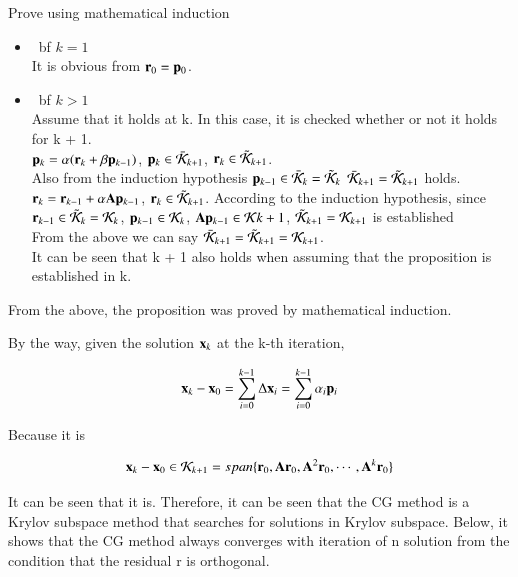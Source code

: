 Prove using mathematical induction

\begin {itemize}
\item {\ bf $k=1$} \\
It is obvious from $\mathbf{r}_0=\mathbf{p}_0$.

\item {\ bf $k>1$} \\
Assume that it holds at k. In this case, it is checked whether or not it holds for k + 1. \\
$\mathbf{p}_k=\alpha(\mathbf{r}_k+\beta\mathbf{p}_{k-1})$, $\mathbf{p}_k\in\bar{\cal K}_{k+1}$, $\mathbf{r}_k\in\tilde{\cal K}_{k+1}$. \\
Also from the induction hypothesis $\mathbf{p}_{k-1}\in\bar{\cal K}_k=\tilde{\cal K}_k$ $\bar{\cal K}_{k+1}=\tilde{\cal K}_{k+1}$ holds. \\
$\mathbf{r}_k=\mathbf{r}_{k-1}+\alpha\mathbf{A}\mathbf{p}_{k-1}$, $\mathbf{r}_k\in\tilde{\cal K}_{k+1}$.
According to the induction hypothesis, since $\mathbf{r}_{k-1}\in\tilde{\cal K}_k={\cal K}_k$, $\mathbf{p}_{k-1}\in{\cal K}_k$, $\mathbf{A}\mathbf{p}_{k-1}\in{\cal K}{k+1}$, $\tilde{\cal K}_{k+1}={\cal K}_{k+1}$ is established \\
From the above we can say $\bar{\cal K}_{k+1}=\tilde{\cal K}_{k+1}={\cal K}_{k+1}$. \\
It can be seen that k + 1 also holds when assuming that the proposition is established in k.
\end{itemize}

From the above, the proposition was proved by mathematical induction.




By the way, given the solution $\mathbf{x}_k$ at the k-th iteration,

\begin{equation}
\mathbf{x}_k-\mathbf{x}_0=\sum_{i=0}^{k-1}\Delta\mathbf{x}_i=\sum_{i=0}^{k-1}\alpha_i\mathbf{p}_i
\end{equation}


Because it is

\begin{equation}
\mathbf{x}_k-\mathbf{x}_0\in\mathbf{\cal K}_{k+1}=span\{\mathbf{r}_0,\mathbf{A}\mathbf{r}_0,\mathbf{A}^2\mathbf{r}_0,\cdots,\mathbf{A}^k\mathbf{r}_0\}
\end{equation}


It can be seen that it is. Therefore, it can be seen that the CG method is a Krylov subspace method that searches for solutions in Krylov subspace. Below, it shows that the CG method always converges with iteration of n solution from the condition that the residual r is orthogonal.



